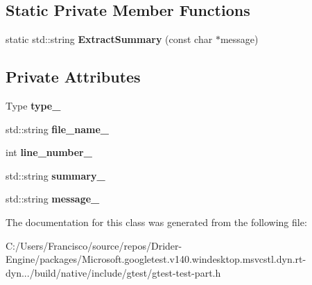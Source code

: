 \subsection*{Static Private Member Functions}
\begin{DoxyCompactItemize}
\item 
\mbox{\label{classtesting_1_1_test_part_result_a331e997e8e2c1da660241358ed497540}} 
static std\+::string {\bfseries Extract\+Summary} (const char $\ast$message)
\end{DoxyCompactItemize}
\subsection*{Private Attributes}
\begin{DoxyCompactItemize}
\item 
\mbox{\label{classtesting_1_1_test_part_result_a4ee7ac490fe4f10e222fa08c3fa25437}} 
Type {\bfseries type\+\_\+}
\item 
\mbox{\label{classtesting_1_1_test_part_result_abf5ab5fc171dc6248579a44353385df6}} 
std\+::string {\bfseries file\+\_\+name\+\_\+}
\item 
\mbox{\label{classtesting_1_1_test_part_result_a7a988009362bcdc28d3b801fc6059b5e}} 
int {\bfseries line\+\_\+number\+\_\+}
\item 
\mbox{\label{classtesting_1_1_test_part_result_a6b9bce29122b56a50295710b7f6e345c}} 
std\+::string {\bfseries summary\+\_\+}
\item 
\mbox{\label{classtesting_1_1_test_part_result_a9adea12d4a4fb4ebf1cd00d22eac9aff}} 
std\+::string {\bfseries message\+\_\+}
\end{DoxyCompactItemize}


The documentation for this class was generated from the following file\+:\begin{DoxyCompactItemize}
\item 
C\+:/\+Users/\+Francisco/source/repos/\+Drider-\/\+Engine/packages/\+Microsoft.\+googletest.\+v140.\+windesktop.\+msvcstl.\+dyn.\+rt-\/dyn.../build/native/include/gtest/gtest-\/test-\/part.\+h\end{DoxyCompactItemize}
